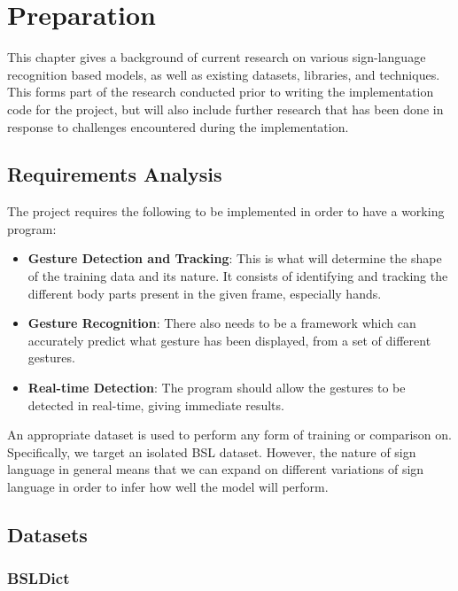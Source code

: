 \documentclass[final,rdr32.tex]{subfiles}
\begin{document}
\chapter{Preparation}

This chapter gives a background of current research on various sign-language recognition based models, as well as existing datasets, libraries, and techniques. This forms part of the research conducted prior to writing the implementation code for the project, but will also include further research that has been done in response to challenges encountered during the implementation.

\section{Requirements Analysis}

The project requires the following to be implemented in order to have a working program:

\begin{itemize}
    \item \textbf{Gesture Detection and Tracking}: This is what will determine the shape of the training data and its nature. It consists of identifying and tracking the different body parts present in the given frame, especially hands.
    \item \textbf{Gesture Recognition}: There also needs to be a framework which can accurately predict what gesture has been displayed, from a set of different gestures.
    \item \textbf{Real-time Detection}: The program should allow the gestures to be detected in real-time, giving immediate results.

\end{itemize}

An appropriate dataset is used to perform any form of training or comparison on. Specifically, we target an isolated BSL dataset. However, the nature of sign language in general means that we can expand on different variations of sign language in order to infer how well the model will perform.

\section{Datasets}

\subsection*{BSLDict}
\end{document}
